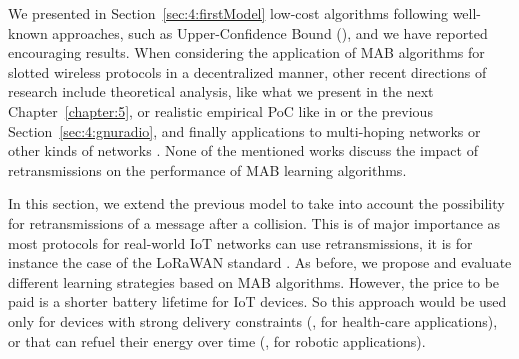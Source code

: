 
\graphicspath{{2-Chapters/4-Chapter/IEEE_WCNC__2019__Paper__BMBM.git/}}


We presented in Section~\ref{sec:4:firstModel} low-cost algorithms following well-known approaches, such as Upper-Confidence Bound (\UCB), and we have reported encouraging results.
When considering the application of MAB algorithms for slotted wireless protocols in a decentralized manner,
other recent directions of research include theoretical analysis, like what we present in the next Chapter~\ref{chapter:5},
or realistic empirical PoC like in \cite{RobertSDR2014,modiDemo2016,darak2016bayesian,kumar2017channel} or the previous Section~\ref{sec:4:gnuradio},
and finally applications to multi-hoping networks \cite{Mitton16,Toldov16} or other kinds of networks \cite{Azari18,Wilhelmi19collaborative,Wilhelmi19potential}.
%
None of the mentioned works discuss the impact of retransmissions on the performance of MAB learning algorithms.

In this section, we extend the previous model to take into account the possibility for retransmissions of a message after a collision.
This is of major importance as most protocols for real-world IoT networks can use retransmissions, it is for instance the case of the LoRaWAN standard \cite{Raza17}.
As before, we propose and evaluate different learning strategies based on MAB algorithms.
However, the price to be paid is a shorter battery lifetime for IoT devices. So this approach would be used only for devices with strong delivery constraints (\eg, for health-care applications), or that can refuel their energy over time (\eg, for robotic applications).


